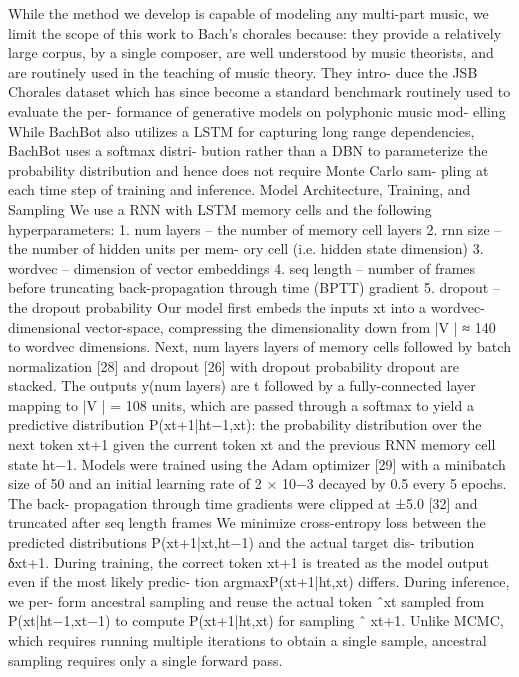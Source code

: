 \cite{Liang2017} While the method we develop is capable of modeling any multi-part music, we limit the scope of this work to Bach’s chorales because: they provide a relatively large corpus, by a single composer, are well understood by music theorists, and are routinely used in the teaching of music theory. They intro- duce the JSB Chorales dataset which has since become a standard benchmark routinely used to evaluate the per- formance of generative models on polyphonic music mod- elling 
While BachBot also utilizes a LSTM for capturing long range dependencies, BachBot uses a softmax distri- bution rather than a DBN to parameterize the probability distribution and hence does not require Monte Carlo sam- pling at each time step of training and inference. 
Model Architecture, Training, and Sampling
We use a RNN with LSTM memory cells and the following hyperparameters: 1. num layers – the number of memory cell layers
2. rnn size – the number of hidden units per mem- ory cell (i.e. hidden state dimension)
3. wordvec – dimension of vector embeddings
4. seq length – number of frames before truncating back-propagation through time (BPTT) gradient
5. dropout – the dropout probability
Our model first embeds the inputs xt into a wordvec- dimensional vector-space, compressing the dimensionality
down from |V | ≈ 140 to wordvec dimensions. Next, num layers layers of memory cells followed by batch normalization [28] and dropout [26] with dropout probability dropout are stacked. The outputs y(num layers) are t followed by a fully-connected layer mapping to |V | = 108 units, which are passed through a softmax to yield a predictive distribution P(xt+1|ht−1,xt): the probability distribution over the next token xt+1 given the current token xt and the previous RNN memory cell state ht−1. Models were trained using the Adam optimizer [29] with a minibatch size of 50 and an initial learning rate
of 2 × 10−3 decayed by 0.5 every 5 epochs. The back- propagation through time gradients were clipped at ±5.0 [32] and truncated after seq length frames
We minimize cross-entropy loss between the predicted distributions P(xt+1|xt,ht−1) and the actual target dis- tribution δxt+1. During training, the correct token xt+1 is treated as the model output even if the most likely predic- tion argmaxP(xt+1|ht,xt) differs. 
During inference, we per- form ancestral sampling and reuse the actual token ˆxt sampled from P(xt|ht−1,xt−1) to compute P(xt+1|ht,xt) for sampling ˆ
xt+1. Unlike MCMC, which requires running multiple iterations to obtain a single sample, ancestral sampling requires only a single forward pass.
